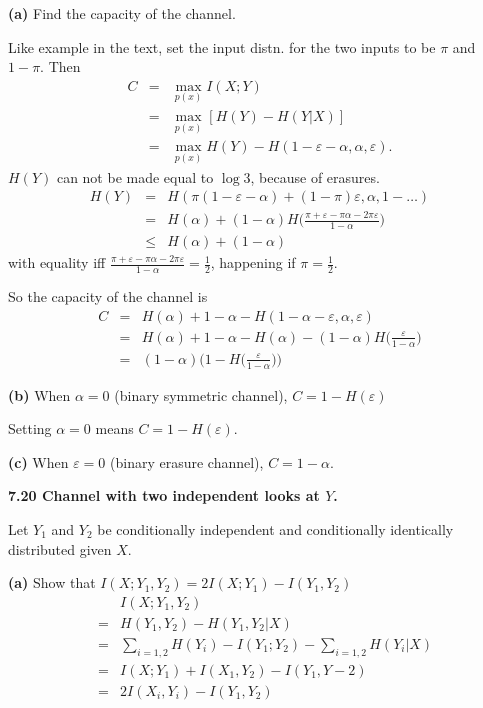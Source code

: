 \documentclass[10pt]{article}
\begin{document}
\begin{tiny}
\begin{multicols}{3}
\textbf{(a)} Find the capacity of the channel.

Like example in the text, set the input distn. for the two inputs to be $\pi$ and $1-\pi$. Then
\begin{eqnarray*}
    C &=& \max_{p(x)}I(X;Y) \\
    &=& \max_{p(x)}[H(Y) - H(Y|X)] \\
    &=& \max_{p(x)}H(Y) - H(1-\varepsilon-\alpha,\alpha,\varepsilon).
\end{eqnarray*}
$H(Y)$ can not be made equal to $\log 3$, because of erasures. 
\begin{eqnarray*}
    H(Y) &=& H( \pi(1-\varepsilon-\alpha) + (1-\pi)\varepsilon,\alpha, 1 - \dots)\\ %
    &=& H(\alpha) + (1-\alpha)H\bigg(\frac{\pi+\varepsilon -\pi\alpha-2\pi\varepsilon}{1-\alpha}\bigg) \\
    &\le& H(\alpha) + (1-\alpha)
\end{eqnarray*}
with equality iff $\frac{\pi+\varepsilon -\pi\alpha-2\pi\varepsilon}{1-\alpha} = \frac{1}{2}$, happening if $\pi = \frac{1}{2}$.

So the capacity of the channel is
\begin{eqnarray*}
    C &=& H(\alpha) + 1 - \alpha - H(1-\alpha-\varepsilon,\alpha,\varepsilon) \\
    &=& H(\alpha) + 1 - \alpha - H(\alpha) - (1-\alpha) H\bigg(\frac{\varepsilon}{1-\alpha}\bigg) \\
    &=& (1-\alpha) \bigg(1 - H\bigg(\frac{\varepsilon}{1-\alpha}\bigg)\bigg)
\end{eqnarray*}

\textbf{(b)} When $\alpha = 0$ (binary symmetric channel), $C = 1- H(\varepsilon)$

Setting $\alpha = 0$ means $C=1-H(\varepsilon)$.

\textbf{(c)} When $\varepsilon = 0$ (binary erasure channel), $C=1-\alpha$.

\textbf{\scriptsize 7.20 Channel with two independent looks at $Y$.}

Let $Y_1$ and $Y_2$ be conditionally independent and conditionally identically distributed given $X$.

\textbf{(a)} Show that $I(X;Y_1, Y_2) = 2I(X;Y_1) - I(Y_1,Y_2)$
\begin{eqnarray*}
    && I(X;Y_1,Y_2) \\
    &=& H(Y_1,Y_2) - H(Y_1,Y_2 | X) \\
    &=& \sum_{i=1,2} H(Y_i) - I(Y_1;Y_2) - \sum_{i=1,2} H (Y_i|X) \\
    &=& I(X;Y_1) + I(X_1,Y_2) - I(Y_1,Y-2) \\
    &=& 2I(X_i,Y_i) - I(Y_1,Y_2)
\end{eqnarray*}


\end{multicols}
\end{tiny}
\end{document}
